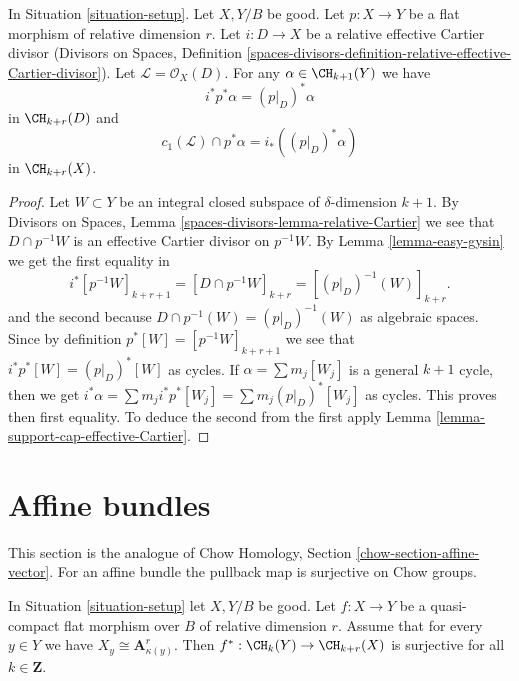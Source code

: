 \begin{lemma}
\label{lemma-relative-effective-cartier}
In Situation \ref{situation-setup}. Let $X, Y/B$ be good.
Let $p : X \to Y$ be a flat morphism of relative dimension $r$.
Let $i : D \to X$ be a relative effective Cartier divisor
(Divisors on Spaces, Definition
\ref{spaces-divisors-definition-relative-effective-Cartier-divisor}).
Let $\mathcal{L} = \mathcal{O}_X(D)$.
For any $\alpha \in \CH_{k + 1}(Y)$ we have
$$
i^*p^*\alpha = (p|_D)^*\alpha
$$
in $\CH_{k + r}(D)$ and
$$
c_1(\mathcal{L}) \cap p^*\alpha = i_* ((p|_D)^*\alpha)
$$
in $\CH_{k + r}(X)$.
\end{lemma}

\begin{proof}
Let $W \subset Y$ be an integral closed subspace of $\delta$-dimension
$k + 1$. By Divisors on Spaces, Lemma
\ref{spaces-divisors-lemma-relative-Cartier}
we see that $D \cap p^{-1}W$ is an effective
Cartier divisor on $p^{-1}W$. By Lemma \ref{lemma-easy-gysin}
we get the first equality in
$$
i^*[p^{-1}W]_{k + r + 1} =
[D \cap p^{-1}W]_{k + r} =
[(p|_D)^{-1}(W)]_{k + r}.
$$
and the second because $D \cap p^{-1}(W) = (p|_D)^{-1}(W)$ as algebraic spaces.
Since by definition $p^*[W] = [p^{-1}W]_{k + r + 1}$ we see that
$i^*p^*[W] = (p|_D)^*[W]$ as cycles. If $\alpha = \sum m_j[W_j]$ is a
general $k + 1$ cycle, then we get
$i^*\alpha = \sum m_j i^*p^*[W_j] = \sum m_j(p|_D)^*[W_j]$ as cycles.
This proves then first equality. To deduce the second from the
first apply Lemma \ref{lemma-support-cap-effective-Cartier}.
\end{proof}












\section{Affine bundles}
\label{section-affine-vector}

\noindent
This section is the analogue of
Chow Homology, Section \ref{chow-section-affine-vector}.
For an affine bundle the pullback map is surjective on Chow groups.

\begin{lemma}
\label{lemma-pullback-affine-fibres-surjective}
In Situation \ref{situation-setup} let $X, Y/B$ be good.
Let $f : X \to Y$ be a quasi-compact flat morphism over $B$
of relative dimension $r$. Assume that for every $y \in Y$ we have
$X_y \cong \mathbf{A}^r_{\kappa(y)}$.
Then $f^* : \CH_k(Y) \to \CH_{k + r}(X)$ is surjective for all
$k \in \mathbf{Z}$.
\end{lemma}

